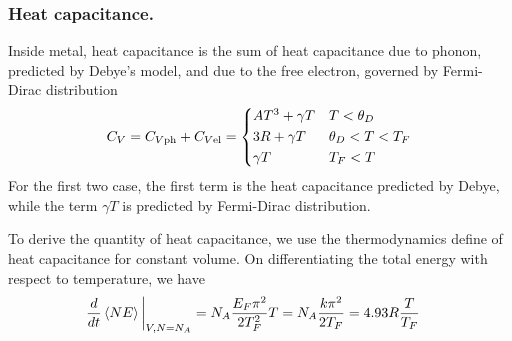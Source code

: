 \documentclass[../../../Main.tex]{subfiles}
\begin{document}
\subsubsection{Heat capacitance.} Inside metal, heat capacitance is the sum of heat capacitance due to phonon, predicted by Debye's model, and due to the free electron, governed by Fermi-Dirac distribution 
\begin{equation*}
    C_V=C_{V\text{ph}}+C_{V\text{el}}=\begin{cases*}
        AT^3+\gamma T &$T<\theta_D$\\
        3R+\gamma T & $\theta_D<T<T_F$\\
        \gamma T &$T_F<T$
    \end{cases*}
\end{equation*}
For the first two case, the first term is the heat capacitance predicted by Debye, while the term $\gamma T$ is predicted by Fermi-Dirac distribution.

To derive the quantity of heat capacitance, we use the thermodynamics define of heat capacitance for constant volume. On differentiating the total energy with respect to temperature, we have 
\begin{align*}
    \frac{d}{dt}\braket{NE}\bigg|_{V,N=N_A}&=N_A \frac{E_F\pi^2}{2T_F^2}T=N_A\frac{k\pi^2}{2T_F}=4.93R\frac{T}{T_F}
\end{align*}
\end{document}
